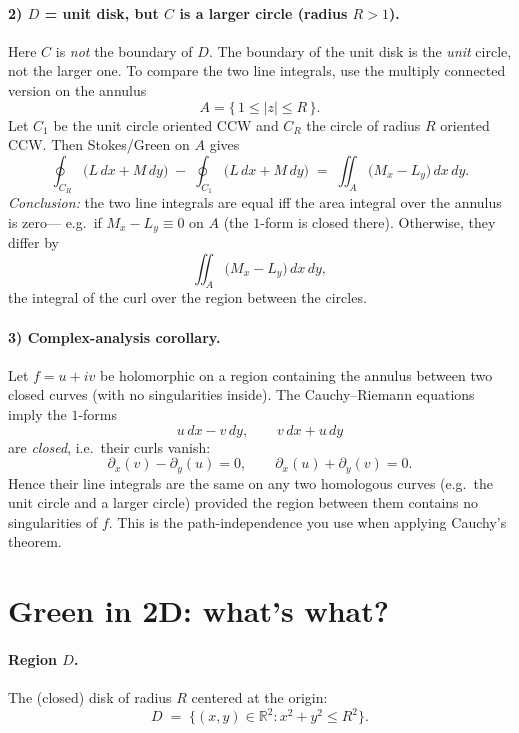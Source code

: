 \documentclass[11pt]{article}
\begin{document}
\paragraph{2) $D$ = unit disk, but $C$ is a larger circle (radius $R>1$).}
Here $C$ is \emph{not} the boundary of $D$. The boundary of the unit disk is the \emph{unit}
circle, not the larger one. To compare the two line integrals, use the multiply connected version
on the annulus
\[
A=\{\,1\le |z|\le R\,\}.
\]
Let $C_{1}$ be the unit circle oriented CCW and $C_{R}$ the circle of radius $R$ oriented CCW.
Then Stokes/Green on $A$ gives
\[
\oint_{C_{R}}\!\bigl(L\,dx+M\,dy\bigr)
\;-\;
\oint_{C_{1}}\!\bigl(L\,dx+M\,dy\bigr)
\;=\;
\iint_{A}\!\bigl(M_{x}-L_{y}\bigr)\,dx\,dy.
\]
\emph{Conclusion:} the two line integrals are equal iff the area integral over the annulus is zero—
e.g.\ if $M_{x}-L_{y}\equiv 0$ on $A$ (the $1$-form is closed there). Otherwise, they differ by
\[
\iint_{A}\!\bigl(M_{x}-L_{y}\bigr)\,dx\,dy,
\]
the integral of the curl over the region between the circles.

\bigskip

\paragraph{3) Complex-analysis corollary.}
Let $f=u+iv$ be holomorphic on a region containing the annulus between two closed curves
(with no singularities inside). The Cauchy–Riemann equations imply the $1$-forms
\[
u\,dx - v\,dy,
\qquad
v\,dx + u\,dy
\]
are \emph{closed}, i.e.\ their curls vanish:
\[
\partial_x(v)-\partial_y(u)=0,
\qquad
\partial_x(u)+\partial_y(v)=0.
\]
Hence their line integrals are the same on any two homologous curves (e.g.\ the unit circle and a
larger circle) provided the region between them contains no singularities of $f$. This is the
path-independence you use when applying Cauchy’s theorem.

\section*{Green in 2D: what's what?}

\paragraph{Region $D$.}
The (closed) disk of radius $R$ centered at the origin:
\[
D \;=\; \{(x,y)\in\mathbb{R}^2 : x^2+y^2 \le R^2\}.
\]
\end{document}
